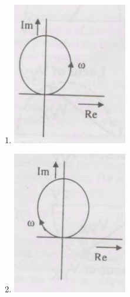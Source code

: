 \documentclass[journal,12pt,onecolumn]{IEEEtran}
\theoremstyle{remark}
\begin{document}
\begin{enumerate}
\begin{enumerate}
\item \includegraphics[width=5cm]{figs/fig 11.3.png}
\item \includegraphics[width=5cm]{figs/fig 11.4.png}
\end{enumerate}


\end{enumerate}
\end{document}
